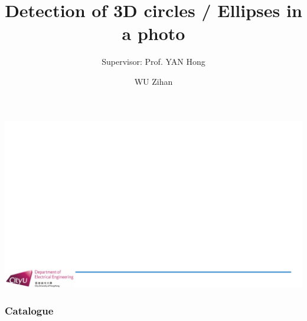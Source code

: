 \documentclass[aspectratio=169]{beamer}
\title{Detection of 3D circles / Ellipses in a photo}
\author{WU Zihan}
\subtitle{Supervisor: Prof. YAN Hong}
\begin{document}
{\includegraphics[width=\paperwidth]{EE8001 Presentation Template.pdf}} 
    \maketitle
    \begin{frame}
        \frametitle{Catalogue}
        \tableofcontents
    \end{frame}
\end{document}
